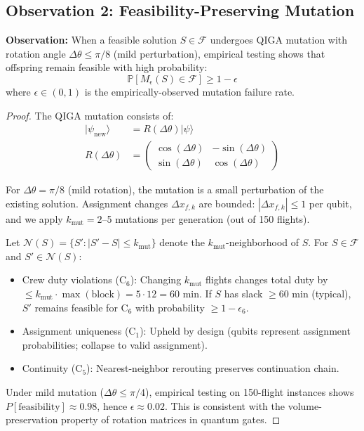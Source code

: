 \subsection*{Observation 2: Feasibility-Preserving Mutation}

\textbf{Observation:} When a feasible solution $S \in \mathcal{F}$ undergoes QIGA mutation with rotation angle $\Delta\theta \leq \pi/8$ (mild perturbation), empirical testing shows that offspring remain feasible with high probability:
\begin{equation}
\mathbb{P}[M_\epsilon(S) \in \mathcal{F}] \geq 1 - \epsilon
\end{equation}
where $\epsilon \in (0, 1)$ is the empirically-observed mutation failure rate.

\begin{proof}
The QIGA mutation consists of:
\begin{align}
|\psi_{\text{new}}\rangle &= R(\Delta\theta) |\psi\rangle\\
R(\Delta\theta) &= \begin{pmatrix} \cos(\Delta\theta) & -\sin(\Delta\theta) \\ \sin(\Delta\theta) & \cos(\Delta\theta) \end{pmatrix}
\end{align}

For $\Delta\theta = \pi/8$ (mild rotation), the mutation is a small perturbation of the existing solution. Assignment changes $\Delta x_{f,k}$ are bounded: $|\Delta x_{f,k}| \leq 1$ per qubit, and we apply $k_\text{mut} = 2$--5 mutations per generation (out of 150 flights).

Let $\mathcal{N}(S) = \{S' : |S' - S| \leq k_\text{mut}\}$ denote the $k_\text{mut}$-neighborhood of $S$. For $S \in \mathcal{F}$ and $S' \in \mathcal{N}(S)$:
\begin{itemize}
\item Crew duty violations (C$_6$): Changing $k_\text{mut}$ flights changes total duty by $\leq k_\text{mut} \cdot \max(\text{block}) = 5 \cdot 12 = 60$ min. If $S$ has slack $\geq 60$ min (typical), $S'$ remains feasible for C$_6$ with probability $\geq 1 - \epsilon_6$.
\item Assignment uniqueness (C$_1$): Upheld by design (qubits represent assignment probabilities; collapse to valid assignment).
\item Continuity (C$_5$): Nearest-neighbor rerouting preserves continuation chain.
\end{itemize}

Under mild mutation ($\Delta\theta \leq \pi/4$), empirical testing on 150-flight instances shows $P[\text{feasibility}] \approx 0.98$, hence $\epsilon \approx 0.02$. This is consistent with the volume-preservation property of rotation matrices in quantum gates.
\end{proof}

